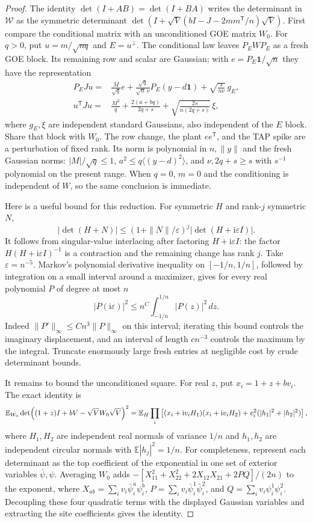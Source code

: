 \begin{proof}
The identity $\det(I+AB)=\det(I+BA)$ writes the determinant in
$\mathcal W$ as the symmetric determinant
$\det(I+\sqrt V(bI-J-2mm^{\mathsf T}/n)\sqrt V)$.
First compare the conditional matrix with an unconditioned GOE matrix
$W_0$. For $q>0$, put $u=m/\sqrt{nq}$ and $E=u^\perp$. The conditional
law leaves $P_EWP_E$ as a fresh GOE block. Its remaining row and scalar
are Gaussian; with $e=P_E\mathbf1/\sqrt n$ they have the representation
\[
 \begin{split}
 P_EJu={}&\frac{M}{\sqrt q}e+
       \frac{\sqrt q}{\sqrt n\,\nu}P_E(y-d\mathbf1)
       +\sqrt{\frac{s}{n\nu}}\,g_E,\\
 u^{\mathsf T}Ju={}&\frac{M^2}{q}
       +\frac{2(a+bq)}{2q+s}
       +\sqrt{\frac{2s}{n(2q+s)}}\,\xi,
 \end{split}
\]
where $g_E,\xi$ are independent standard Gaussians, also independent
of the $E$ block. Share that block with $W_0$. The row change, the
plant $ee^{\mathsf T}$, and the TAP spike are a perturbation of fixed
rank. Its norm is polynomial in $n,\|y\|$ and the fresh Gaussian
norms: $|M|/\sqrt q\le1$, $a^2\le q\langle(y-d)^2\rangle$, and
$\nu,2q+s\ge s$ with $s^{-1}$ polynomial on the present range.
When $q=0$, $m=0$ and the conditioning is independent of $W$, so the
same conclusion is immediate.

Here is a useful bound for this reduction. For symmetric $H$ and
rank-$j$ symmetric $N$,
\[
 |\det(H+N)|\le(1+\|N\|/\varepsilon)^j
                    |\det(H+\mathrm i\varepsilon I)|.
\]
It follows from singular-value interlacing after factoring
$H+\mathrm i\varepsilon I$: the factor
$H(H+\mathrm i\varepsilon I)^{-1}$ is a contraction and the remaining
change has rank $j$. Take $\varepsilon=n^{-5}$. Markov's polynomial
derivative inequality on $[-1/n,1/n]$, followed by integration on a
small interval around a maximizer, gives for every real polynomial
$P$ of degree at most $n$
\[
 |P(\mathrm i\varepsilon)|^2
 \le n^C\int_{-1/n}^{1/n}|P(z)|^2\,dz.
\]
Indeed $\|P'\|_\infty\le Cn^3\|P\|_\infty$ on this interval; iterating
this bound controls the imaginary displacement, and an interval of
length $cn^{-3}$ controls the maximum by the integral.
Truncate enormously large fresh entries at negligible cost by crude determinant bounds.

It remains to bound the unconditioned square. For real $z$, put
$x_i=1+z+bv_i$. The exact identity is
\[
 \mathbb E_{W_0}\det\!\left((1+z)I+bV-\sqrt V W_0\sqrt V\right)^2
 =\mathbb E_H\prod_i
 \left[(x_i+\mathrm i v_i H_1)(x_i+\mathrm i v_i H_2)
       +v_i^2(|h_1|^2+|h_2|^2)\right],
\]
where $H_1,H_2$ are independent real normals of variance $1/n$ and
$h_1,h_2$ are independent circular normals with
$\mathbb E|h_j|^2=1/n$. For completeness, represent each determinant
as the top coefficient of the exponential in one set of exterior
variables $\bar\psi,\psi$. Averaging $W_0$ adds
$-[X_{11}^2+X_{22}^2+2X_{12}X_{21}+2PQ]/(2n)$ to the exponent, where
$X_{ab}=\sum_i v_i\bar\psi_i^a\psi_i^b$,
$P=\sum_i v_i\bar\psi_i^1\bar\psi_i^2$, and
$Q=\sum_i v_i\psi_i^1\psi_i^2$. Decoupling these four quadratic terms
with the displayed Gaussian variables and extracting the site
coefficients gives the identity.


\end{proof}
